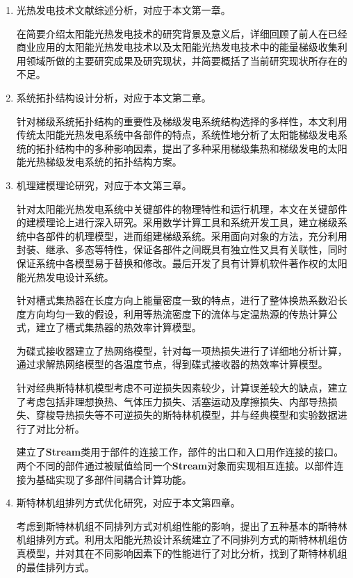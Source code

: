 \begin{enumerate}[label=(\arabic*)]
	
	\item 光热发电技术文献综述分析，对应于本文第一章。
	\setlength\parindent{2em}
	
	在简要介绍太阳能光热发电技术的研究背景及意义后，详细回顾了前人在已经商业应用的太阳能光热发电技术以及太阳能光热发电技术中的能量梯级收集利用领域所做的主要研究成果及研究现状，并简要概括了当前研究现状所存在的不足。
	\item 系统拓扑结构设计分析，对应于本文第二章。
	
	针对梯级系统拓扑结构的重要性及梯级发电系统结构选择的多样性，本文利用传统太阳能光热发电系统中各部件的特点，系统性地分析了太阳能梯级发电系统的拓扑结构中的多种影响因素，提出了多种采用梯级集热和梯级发电的太阳能光热梯级发电系统的拓扑结构方案。 

	\item 机理建模理论研究，对应于本文第三章。
	
	针对太阳能光热发电系统中关键部件的物理特性和运行机理，本文在关键部件的建模理论上进行深入研究。采用数学计算工具和系统开发工具，建立梯级系统中各部件的机理模型，进而组建梯级系统。采用面向对象的方法，充分利用封装、继承、多态等特性，保证各部件之间既具有独立性又具有关联性，同时保证系统中各模型易于替换和修改。最后开发了具有计算机软件著作权的太阳能光热发电设计系统。
	
	针对槽式集热器在长度方向上能量密度一致的特点，进行了整体换热系数沿长度方向均匀一致的假设，利用等热流密度下的流体与定温热源的传热计算公式，建立了槽式集热器的热效率计算模型。
	
	为碟式接收器建立了热网络模型，针对每一项热损失进行了详细地分析计算，通过求解热网络模型的各温度节点，得到碟式接收器的热效率计算模型。
	
	针对经典斯特林机模型考虑不可逆损失因素较少，计算误差较大的缺点，建立了考虑包括非理想换热、气体压力损失、活塞运动及摩擦损失、内部导热损失、穿梭导热损失等不可逆损失的斯特林机模型，并与经典模型和实验数据进行了对比分析。
	
	建立了\textbf{Stream}类用于部件的连接工作，部件的出口和入口用作连接的接口。两个不同的部件通过被赋值给同一个\textbf{Stream}对象而实现相互连接。以部件连接为基础实现了多部件间耦合计算功能。

	\item 斯特林机组排列方式优化研究，对应于本文第四章。
	
	考虑到斯特林机组不同排列方式对机组性能的影响，提出了五种基本的斯特林机组排列方式。利用太阳能光热设计系统建立了不同排列方式的斯特林机组仿真模型，并对其在不同影响因素下的性能进行了对比分析，找到了斯特林机组的最佳排列方式。


\end{enumerate}
